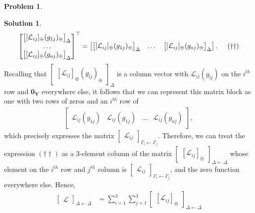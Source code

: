 \documentclass{article}
\theoremstyle{definition}
\newtheorem*{prob*}{Problem}
\newtheorem*{sln*}{Solution}
\newcommand{\V}{\mathbf{V}}
\newcommand{\lag}{\mathcal{L}}
\begin{document}
\begin{prob*}
\begin{sln*}
\begin{align*}
\begin{bmatrix}
\begin{bmatrix}
	[\lag_{ij}]_\oplus(g_{1j})_\oplus
	\end{bmatrix}_\Delta
	\\\dots\\
	\begin{bmatrix}
	[\lag_{ij}]_\oplus(g_{aj})_\oplus
	\end{bmatrix}_\Delta
	\end{bmatrix}^\top
	=
	\begin{bmatrix}
	\begin{bmatrix}
	[\lag_{ij}]_\oplus(g_{1j})_\oplus
	\end{bmatrix}_\Delta
	&\dots&
	\begin{bmatrix}
	[\lag_{ij}]_\oplus(g_{aj})_\oplus
	\end{bmatrix}_\Delta
	\end{bmatrix}. \hspace{0.5cm}(\dagger\dagger)
	\end{align*}
	Recalling that $\begin{bmatrix}[\lag_{ij}]_\oplus(g_{lj})_\oplus
	\end{bmatrix}_\Delta$ is a column vector with $\lag_{ij}(g_{lj})$ on the $i^{th}$ row and $\mathbf{0}_\V$ everywhere else, it follows that we can represent this matrix block as one with two rows of zeros and an $i^{th}$ row of 
	\begin{align*}
	\begin{bmatrix}
	\lag_{ij}(g_{1j}) & \lag_{ij}(g_{1j}) & \dots & \lag_{ij}(g_{aj})
	\end{bmatrix},
	\end{align*}
	which precisely expresses the matrix $\begin{bmatrix}
	\lag_{ij}
	\end{bmatrix}_{\Gamma_i\leftarrow\Gamma_j}$. Therefore, we can treat the expression $(\dagger\dagger)$ as a 3-element column of the matrix $\begin{bmatrix}[\lag_{ij}]_\oplus\end{bmatrix}_{\Delta\leftarrow\Delta}$ whose element on the $i^{th}$ row and $j^{th}$ column is $\begin{bmatrix}
	\lag_{ij}
	\end{bmatrix}_{\Gamma_i\leftarrow\Gamma_j}$, and the zero function everywhere else. Hence,
	\begin{align*}
	\begin{bmatrix}
	\lag
	\end{bmatrix}_{\Delta\leftarrow\Delta} &= \sum^3_{i=1}\sum^3_{j=1}\begin{bmatrix}[\lag_{ij}]_\oplus\end{bmatrix}_{\Delta\leftarrow\Delta}\\

\end{align*}
\end{sln*}
\end{prob*}
\end{document}
